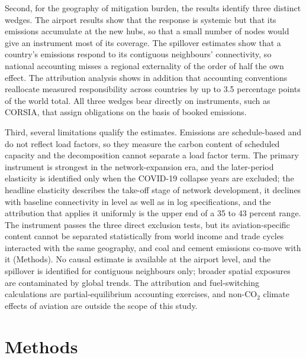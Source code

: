 \documentclass[12pt]{article}
\begin{document}
Second, for the geography of mitigation burden, the results identify three
distinct wedges. The airport results show that the response is systemic
but that its emissions accumulate at the new hubs, so that a small number
of nodes would give an instrument most of its coverage. The spillover
estimates show that a country's emissions respond to its contiguous
neighbours' connectivity, so national accounting misses a regional
externality of the order of half the own effect. The attribution analysis
shows in addition that accounting conventions reallocate measured
responsibility across countries by up to 3.5 percentage points of the
world total. All three wedges bear directly on instruments, such as
CORSIA, that assign obligations on the basis of booked emissions.

Third, several limitations qualify the estimates. Emissions are
schedule-based and do not reflect load factors, so they measure the carbon
content of scheduled capacity and the decomposition cannot separate a load
factor term. The primary instrument is strongest in the network-expansion
era, and the later-period elasticity is identified only when the COVID-19
collapse years are excluded; the headline elasticity describes the
take-off stage of network development, it declines with baseline
connectivity in level as well as in log specifications, and the
attribution that applies it uniformly is the upper end of a 35 to 43
percent range. The instrument passes the three
direct exclusion tests, but its aviation-specific content cannot be
separated statistically from world income and trade cycles interacted
with the same geography, and coal and cement emissions co-move with it
(Methods). No causal estimate is available at the airport level, and the
spillover is identified for contiguous neighbours only; broader spatial
exposures are contaminated by global trends. The attribution and
fuel-switching calculations are partial-equilibrium accounting exercises,
and non-CO$_2$ climate effects of aviation are outside the scope of this
study.

\section*{Methods}
\end{document}
